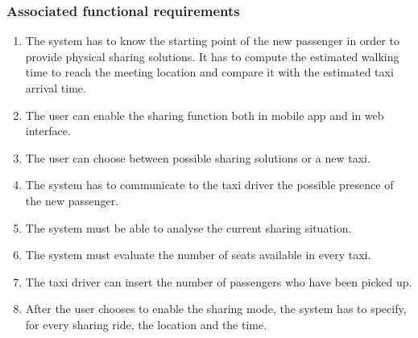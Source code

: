 \subsubsection{Associated functional requirements}
\begin{enumerate}
\item The system has to know the starting point of the new passenger in order to provide physical sharing solutions. It has to compute the estimated walking time to reach the meeting location and compare it with the estimated taxi arrival time.
\item The user can enable the sharing function both in mobile app and in web interface.
\item The user can choose between possible sharing solutions or a new taxi.
\item The system has to communicate to the taxi driver the possible presence of the new passenger.
\item The system must be able to analyse the current sharing situation.
\item The system must evaluate the number of seats available in every taxi.
\item The taxi driver can insert the number of passengers who have been picked up.
\item After the user chooses to enable the sharing mode, the system has to specify, for every sharing ride, the location and the time.
\end{enumerate}